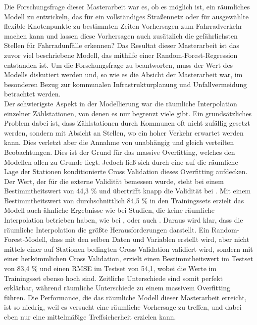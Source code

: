 \documentclass[a4paper,12pt]{thesis}
\begin{document}
Die Forschungsfrage dieser Masterarbeit war es, ob es möglich ist, ein räumliches Modell zu entwickeln, das für ein vollständiges Straßennetz oder für ausgewählte flexible Knotenpunkte zu bestimmten Zeiten Vorhersagen zum Fahrradverkehr machen kann und lassen diese Vorhersagen auch zusätzlich die gefährlichsten Stellen für Fahrradunfälle erkennen? Das Resultat dieser Masterarbeit ist das zuvor viel beschriebene Modell, das mithilfe einer Random-Forest-Regression entstanden ist. Um die Forschungsfrage zu beantworten, muss der Wert des Modells diskutiert werden und, so wie es die Absicht der Masterarbeit war, im besonderen Bezug zur kommunalen Infrastrukturplanung und Unfallvermeidung betrachtet werden.\\
Der schwierigste Aspekt in der Modellierung war die räumliche Interpolation einzelner Zählstationen, von denen es nur begrenzt viele gibt. Ein grundsätzliches Problem dabei ist, dass Zählstationen durch Kommunen oft nicht zufällig gesetzt werden, sondern mit Absicht an Stellen, wo ein hoher Verkehr erwartet werden kann. Dies verletzt aber die Annahme von unabhängig und gleich verteilten Beobachtungen. Dies ist der Grund für das massive Overfitting, welches den Modellen allen zu Grunde liegt. Jedoch ließ sich durch eine auf die räumliche Lage der Stationen konditionierte Cross Validation dieses Overfitting aufdecken. Der Wert, der für die externe Validität bemessen wurde, steht bei einem Bestimmtheitswert von 44,3 \% und übertrifft knapp die Validität bei \cite{Alattar2021}. Mit einem Bestimmtheitswert von durchschnittlich 84,5 \% in den Trainingssets erzielt das Modell auch ähnliche Ergebnisse wie bei Studien, die keine räumliche Interpolation betrieben haben, wie bei \cite{Holmgren2017}, \cite{Broucke2019} oder auch \cite{Wessel2020}. Daraus wird klar, dass die räumliche Interpolation die größte Herausforderungen darstellt. Ein Random-Forest-Modell, dass mit den selben Daten und Variablen erstellt wird, aber nicht mittels einer auf Stationen bedingten Cross Validation validiert wird, sondern mit einer herkömmlichen Cross Validation, erzielt einen Bestimmtheitswert im Testset von 83,4 \% und einen RMSE im Testset von 54,1, wobei die Werte im Trainingsset ebenso hoch sind. Zeitliche Unterschiede sind somit perfekt erklärbar, während räumliche Unterschiede zu einem massivem Overfitting führen. Die Performance, die das räumliche Modell dieser Masterarbeit erreicht, ist so niedrig, weil es versucht eine räumliche Vorhersage zu treffen, und dabei eben nur eine mittelmäßige Treffsicherheit erzielen kann.\\
\end{document}
